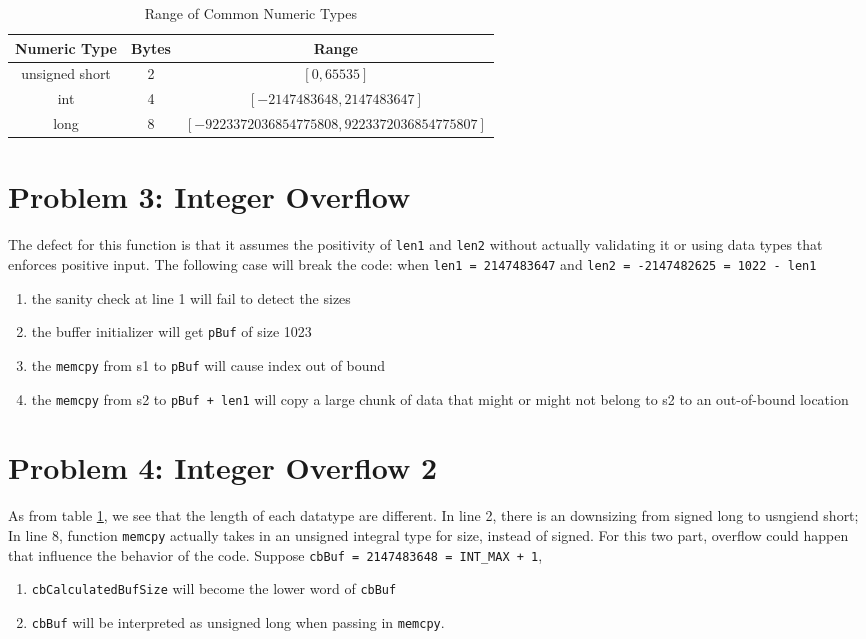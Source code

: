 \documentclass[11pt]{article}
\begin{document}
\begin{table}[b]
\centering
\begin{tabular}{|c|c|c|}
\hline
Numeric Type   & Bytes & Range                                         \\
\hline
unsigned short & 2     & $[0, 65535]$                                  \\
int            & 4     & $[-2147483648, 2147483647]$                   \\
long           & 8     & $[-9223372036854775808, 9223372036854775807]$ \\
\hline
\end{tabular}
\caption{Range of Common Numeric Types}
\label{tab:1}
\end{table}

\section{Problem 3: Integer Overflow}

The defect for this function is that it assumes the positivity of \lstinline{len1} and \lstinline{len2} without actually validating it or using data types that enforces positive input. The following case will break the code: when \lstinline{len1 = 2147483647} and \lstinline{len2 = -2147482625 = 1022 - len1}
\begin{enumerate}
    \item the sanity check at line 1 will fail to detect the sizes
    \item the buffer initializer will get \lstinline{pBuf} of size 1023 
    \item the \lstinline{memcpy} from s1 to \lstinline{pBuf} will cause index out of bound
    \item the \lstinline{memcpy} from s2 to \lstinline{pBuf + len1} will copy a large chunk of data that might or might not belong to s2 to an out-of-bound location
\end{enumerate}

\section{Problem 4: Integer Overflow 2}

As from table \ref{tab:1}, we see that the length of each datatype are different. In line 2, there is an downsizing from signed long to usngiend short; In line 8, function \lstinline{memcpy} actually takes in an unsigned integral type for size, instead of signed. For this two part, overflow could happen that influence the behavior of the code. Suppose \lstinline{cbBuf = 2147483648 = INT_MAX + 1},
\begin{enumerate}
    \item \lstinline{cbCalculatedBufSize} will become the lower word of \lstinline{cbBuf}
    \item \lstinline{cbBuf} will be interpreted as unsigned long when passing in \lstinline{memcpy}.
\end{enumerate}
\end{document}
